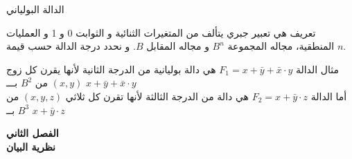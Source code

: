 \begin{frame}{الدالة البولياني}
	\begin{exampleblock}{تعريف}
		هي تعبير جبري يتألف من المتغيرات الثنائية و الثوابت 0 و 1 و العمليات المنطقية، مجاله المجموعة $B^n$ و مجاله المقابل $B$. و نحدد درجة الدالة حسب قيمة $n$.
	\end{exampleblock}
	
	\pause
	\begin{exampleblock}{مثال}
			الدالة
		$F_1 = x + \bar{y} + \bar{x}\cdot y$
		هي دالة بوليانية من الدرجة الثانية لأنها يقرن كل زوج $(x,y)$ من $B^2$ بـــ $x + \bar{y} + \bar{x}\cdot y$\\
		أما الدالة
		$F_2 = x + \bar{y}\cdot z$
		هي دالة من الدرجة الثالثة لأنها تقرن كل ثلاثي $(x,y,z)$ من $B^3$ بــ $x + \bar{y}\cdot z$
	\end{exampleblock}
\end{frame}

\begin{frame}
	\begin{center}
		\Huge
		\textbf{الفصل الثاني}\\[10pt]
		\textbf{نظرية البيان}
	\end{center}
\end{frame}

